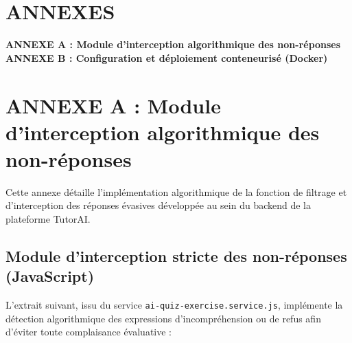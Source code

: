 \documentclass[12pt,a4paper]{report}
\begin{document}
\appendix

\chapter*{ANNEXES}

\noindent
\textbf{ANNEXE A : Module d'interception algorithmique des non-réponses}\newline
\textbf{ANNEXE B : Configuration et déploiement conteneurisé (Docker)}

\newpage
\chapter*{ANNEXE A : Module d'interception algorithmique des non-réponses}

Cette annexe détaille l'implémentation algorithmique de la fonction de filtrage et d'interception des réponses évasives développée au sein du backend de la plateforme TutorAI.

\section*{Module d'interception stricte des non-réponses (JavaScript)}
L'extrait suivant, issu du service \texttt{ai-quiz-exercise.service.js}, implémente la détection algorithmique des expressions d'incompréhension ou de refus afin d'éviter toute complaisance évaluative :
\end{document}
